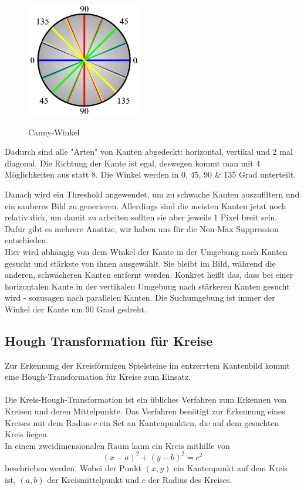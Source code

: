 \documentclass[paper=A4, deutsch]{scrartcl}
\begin{document}
\begin{figure}[ht]
	\centering
		\includegraphics[width=5cm]{CannyEdgeWheel.png}\\
	\caption[Canny-Winkel]{Canny-Winkel}
	\label{fig:nettop}
\end{figure}

Dadurch sind alle "Arten" von Kanten abgedeckt: horizontal, vertikal und 2 mal diagonal. Die Richtung der Kante ist egal, deswegen kommt man mit 4 Möglichkeiten aus statt 8. Die Winkel werden  in 0, 45, 90 \& 135 Grad unterteilt.

Danach wird ein Threshold angewendet, um zu schwache Kanten auszufiltern und ein sauberes Bild zu generieren. Allerdings sind die meisten Kanten jetzt noch relativ dick, um damit zu arbeiten sollten sie aber jeweils 1 Pixel breit sein. Dafür gibt es mehrere Ansätze, wir haben uns für die Non-Max Suppression entschieden.\\
Hier wird abhängig von dem Winkel der Kante in der Umgebung nach Kanten gesucht und stärkste von ihnen ausgewählt. Sie bleibt im Bild, während die anderen, schwächeren Kanten entfernt werden. Konkret heißt das, dass bei einer horizontalen Kante in der vertikalen Umgebung nach stärkeren Kanten gesucht wird - sozusagen nach parallelen Kanten. Die Suchumgebung ist immer der Winkel der Kante um 90 Grad gedreht. \cite{canny1}


\subsection{Hough Transformation für Kreise}
Zur Erkennung der Kreisförmigen Spielsteine im entzerrtem Kantenbild kommt eine Hough-Transformation für Kreise zum Einsatz. \\
\\
Die Kreis-Hough-Transformation ist ein übliches Verfahren zum Erkennen von Kreisen und deren Mittelpunkte. Das Verfahren benötigt zur Erkennung eines Kreises mit dem Radius \(c\) ein Set an Kantenpunkten, die auf dem gesuchten Kreis liegen. \cite{houghnote2}\\
In einem zweidimensionalen Raum kann ein Kreis mithilfe von \\
\begin{equation}
(x - a)^2 +(y - b)^2 = c^2 
\end{equation} 
beschrieben werden. \cite{houghnote1} Wobei der Punkt \((x,y) \) ein Kantenpunkt auf dem Kreis ist, \((a,b)\) der Kreismittelpunkt und \(c\) der Radius des Kreises.\\
\end{document}
